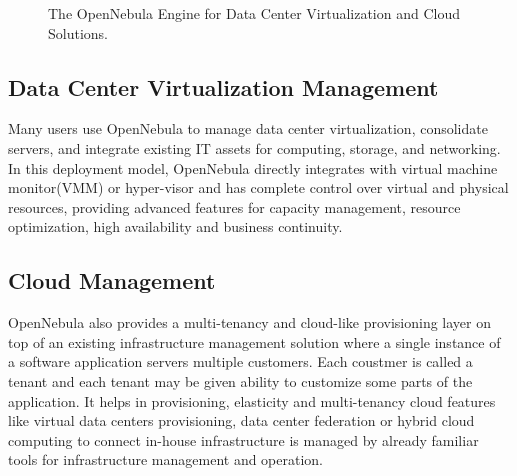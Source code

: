 \documentclass[9pt,twocolumn,twoside]{../../styles/osajnl}
\begin{document}
\begin{figure}[htbp]
	\centering
	\caption{{The OpenNebula Engine for Data Center Virtualization and 
		Cloud Solutions}\cite{www-opennebula-image}.}
	\label{fig:false-color}
\end{figure}

\subsection{Data Center Virtualization Management}

Many users use OpenNebula to manage {data center 
virtualization}\cite{www-dcv-opennebula}, 
consolidate servers, and integrate existing IT assets for computing, 
storage, and networking. In this deployment model, OpenNebula 
directly integrates with virtual machine monitor(VMM) or hyper-visor and
 has complete control over virtual and physical resources, providing advanced features 
for capacity management, resource optimization, high availability and 
business continuity. 

\subsection{Cloud Management}

OpenNebula also provides a multi-tenancy and cloud-like provisioning 
layer on top of an existing infrastructure management solution where a single instance
of a software application servers multiple customers. Each coustmer 
is called a tenant and each tenant may be given ability to customize 
some parts of the application. It helps in provisioning, elasticity and 
multi-tenancy cloud features like virtual data centers provisioning, 
data center federation or hybrid cloud computing to connect in-house 
infrastructure is managed by already familiar tools for 
infrastructure management and operation. 
\end{document}
